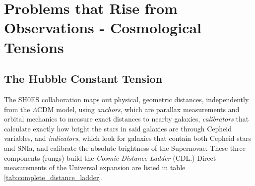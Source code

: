\documentclass{book}
\begin{document}
	\section{Problems that Rise from Observations - Cosmological Tensions}
	\subsection{The Hubble Constant Tension}
	The SH0ES collaboration maps out physical, geometric distances, independently from the $\Lambda$CDM model, using \textit{anchors}, which are parallax measurements and orbital mechanics to measure exact distances to nearby galaxies, \textit{calibrators} that calculate exactly how bright the stars in said galaxies are through Cepheid variables, and \textit{indicators}, which look for galaxies that contain both Cepheid stars and SNIa, and calibrate the absolute brightness of the Supernovae. These three components (rungs) build the \textit{Cosmic Distance Ladder} (CDL.) Direct measurements of the Universal expansion are listed in table \ref{tab:complete_distance_ladder}. 
	
\end{document}
